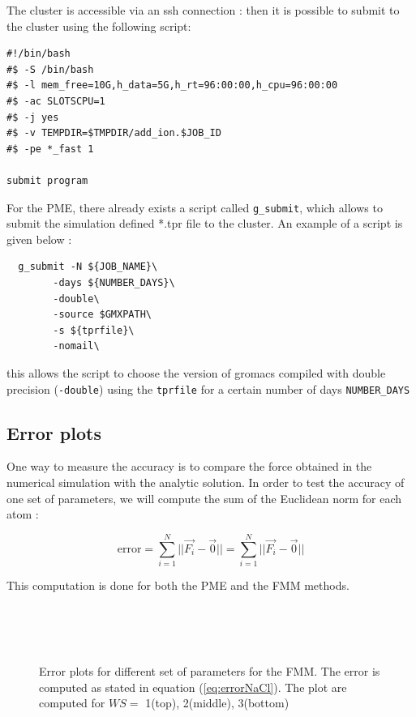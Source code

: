 \documentclass[10pt,twoside,a4paper]{report}
\begin{document}
The cluster is accessible via an ssh connection : then it is possible to submit to the cluster using the following script:


\begin{verbatim}
#!/bin/bash
#$ -S /bin/bash
#$ -l mem_free=10G,h_data=5G,h_rt=96:00:00,h_cpu=96:00:00
#$ -ac SLOTSCPU=1
#$ -j yes
#$ -v TEMPDIR=$TMPDIR/add_ion.$JOB_ID
#$ -pe *_fast 1

submit program 

\end{verbatim}

For the PME, there already exists a script called \texttt{g\_submit}, which allows to submit the simulation defined *.tpr file to the cluster. An example of a script is given below :

\begin{verbatim}
  g_submit -N ${JOB_NAME}\
	    -days ${NUMBER_DAYS}\
	    -double\
	    -source $GMXPATH\
	    -s ${tprfile}\
	    -nomail\
\end{verbatim}

this allows the script to choose the version of gromacs compiled with double precision (\texttt{-double}) using the \texttt{tprfile} for a certain number of days \texttt{NUMBER\_DAYS}



\subsection{Error plots}

One way to measure the accuracy is to compare the force obtained in the numerical simulation with the analytic solution. In order to test the accuracy of one set of parameters, we will compute the sum of the Euclidean norm for each atom :

\begin{equation}
	\label{eq:errorNaCl}
	\text{error} = \sum\limits_{i=1}^N ||\vec{F_i} - \vec{0}|| = \sum\limits_{i=1}^N ||\vec{F_i} - \vec{0}||
\end{equation}

 
	This computation is done for both the PME and the FMM methods.\\
	
	    \begin{figure}[H]
 
    \centering  
 \\    
  \\   
\\    
     \caption{Error plots for different set of parameters for the FMM. The error is computed as stated in equation (\ref{eq:errorNaCl}). The plot are computed for $WS =$ 1(top), 2(middle), 3(bottom)} 
      
   \end{figure}  
   
\end{document}
